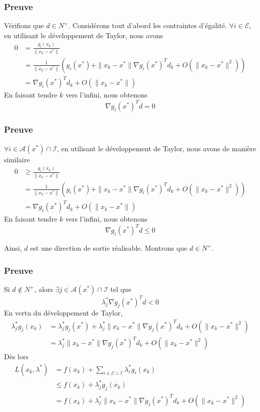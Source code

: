 \documentclass[usepdftitle=false,aspectratio=169]{beamer}
\def\cA{\mathcal{A}}
\def\cE{\mathcal{E}}
\def\cI{\mathcal{I}}
\begin{document}
\begin{frame}
\frametitle{Preuve}

Vérifions que $d \in N^+$. Considérons tout d'abord les contraintes d'égalité.
$\forall i \in \cE$, en utilisant le développement de Taylor, nous avons
\begin{align*}
0 &= \frac{g_i(x_k)}{\| x_k - x^* \| } \\
&= \frac{1}{\| x_k - x^* \| } \left( g_i(x^*) + \| x_k - x^* \| \nabla g_i(x^*)^Td_k + O(\| x_k - x^* \|^2) \right) \\
&= \nabla g_i(x^*)^Td_k + O(\| x_k - x^* \|)
\end{align*}
En faisant tendre $k$ vers l'infini, nous obtenons
$$
\nabla g_i(x^*)^Td = 0
$$

\end{frame}

\begin{frame}
\frametitle{Preuve}

$\forall i \in \cA(x^*) \cap \cI$, en utilisant le développement de Taylor, nous avons de manière similaire
\begin{align*}
0 &\geq \frac{g_i(x_k)}{\| x_k - x^* \| } \\
&= \frac{1}{\| x_k - x^* \| } \left( g_i(x^*) + \| x_k - x^* \| \nabla g_i(x^*)^Td_k + O(\| x_k - x^* \|^2) \right) \\
&= \nabla g_i(x^*)^Td_k + O(\| x_k - x^* \|)
\end{align*}
En faisant tendre $k$ vers l'infini, nous obtenons
$$
\nabla g_i(x^*)^Td \leq 0
$$

\mbox{}

Ainsi, $d$ est une direction de sortie réalisable. Montrons que $d \in N^+$.

\end{frame}

\begin{frame}
\frametitle{Preuve}

Si $d \notin N^+$, alors $\exists j \in \cA(x^*) \cap \cI$ tel que
$$
\lambda_j^* \nabla g_j(x^*)^Td < 0
$$
En vertu du développement de Taylor,
\begin{align*}
\lambda_j^* g_j(x_k)
&= \lambda_j^* g_j(x^*) + \lambda_j^* \| x_k - x^* \| \nabla g_j(x^*)^Td_k + O(\| x_k - x^* \|^2) \\
&= \lambda_j^* \| x_k - x^* \|\nabla g_j(x^*)^Td_k + O(\| x_k - x^* \|^2)
\end{align*}
Dès lors
\begin{align*}
L(x_k, \lambda^*) &= f(x_k) + \sum_{i \in \cE \cup \cI} \lambda_i^* g_i(x_k) \\
&\leq f(x_k) + \lambda_j^* g_j(x_k) \\ 
&=  f(x_k) + \lambda_j^*\| x_k - x^* \|\nabla g_j(x^*)^Td_k + O(\| x_k - x^* \|^2)
\end{align*}

\end{frame}
\end{document}
